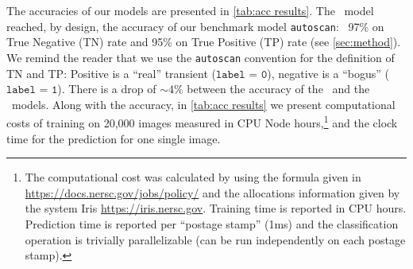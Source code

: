 

The accuracies of our models %
are presented in \autoref{tab:acc results}. The \diabased\ model reached, by design, the accuracy of our benchmark model \texttt{autoscan}: ~97\% on True Negative (TN) rate and 95\% on True Positive (TP) rate (see \autoref{sec:method}). We remind the reader that we use the \texttt{autoscan} convention for the definition of TN and TP: Positive is a ``real'' transient ($\texttt{label = 0}$), negative is a ``bogus'' ($\texttt{label = 1}$). There is a drop of $\sim 4\%$ between the accuracy of the \diabased\ and the \nodia\ models. Along with the accuracy, in \autoref{tab:acc results} we present computational costs of training on 20,000 images measured in CPU Node hours,\footnote{The computational cost was calculated by using the formula given in \url{https://docs.nersc.gov/jobs/policy/} and the allocations information given by the system Iris \url{https://iris.nersc.gov}. Training time is reported in CPU hours. Prediction time is reported per “postage stamp” (1ms) and the classification operation is trivially parallelizable (can be run independently on each postage stamp).} and the clock time for the prediction for one single image.


